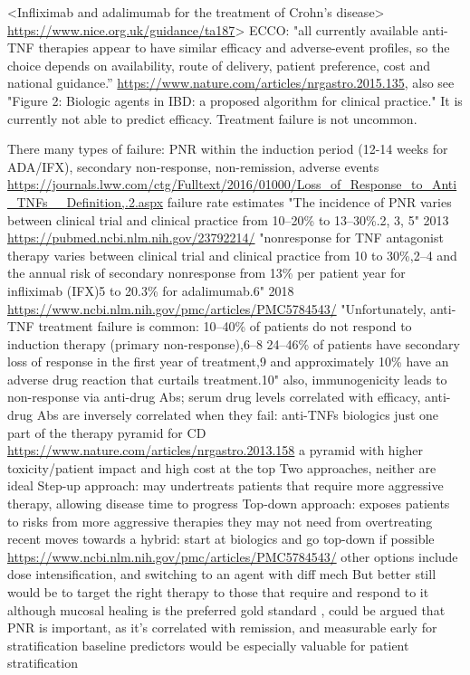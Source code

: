 \begin{outline}
        \3 <Infliximab and adalimumab for the treatment of Crohn's disease> \url{https://www.nice.org.uk/guidance/ta187}>
         ECCO: "all currently available anti-TNF therapies appear to have similar efficacy and adverse-event profiles, so the choice depends on availability, route of delivery, patient preference, cost and national guidance.” \url{https://www.nature.com/articles/nrgastro.2015.135}, also see "Figure 2: Biologic agents in IBD: a proposed algorithm for clinical practice."
    \2 It is currently not able to predict efficacy. Treatment failure is not uncommon.

\1 There many types of failure: \gls{PNR} within the induction period (12-14 weeks for ADA/IFX), secondary non-response, non-remission, adverse events \url{https://journals.lww.com/ctg/Fulltext/2016/01000/Loss_of_Response_to_Anti_TNFs__Definition,.2.aspx}
    \2 failure rate estimates 
        \3 "The incidence of PNR varies between clinical trial and clinical practice from 10–20\% to 13–30\%.2, 3, 5" 2013 \url{https://pubmed.ncbi.nlm.nih.gov/23792214/}
        \3 "nonresponse for TNF antagonist therapy varies between clinical trial and clinical practice from 10 to 30\%,2–4 and the annual risk of secondary nonresponse from 13\% per patient year for infliximab (IFX)5 to 20.3\% for adalimumab.6" 2018 \url{https://www.ncbi.nlm.nih.gov/pmc/articles/PMC5784543/}
        \3 "Unfortunately, anti-TNF treatment failure is common: 10–40\% of patients do not respond to induction therapy (primary non-response),6–8 24–46\% of patients have secondary loss of response in the first year of treatment,9 and approximately 10\% have an adverse drug reaction that curtails treatment.10" \autocite{kennedy2019PredictorsAntiTNFTreatment}
    \2 also, immunogenicity leads to non-response via anti-drug Abs; serum drug levels correlated with efficacy, anti-drug Abs are inversely correlated \autocite{lichtenstein2013ComprehensiveReviewAntitumor}
    \2 when they fail: anti-TNFs biologics just one part of the therapy pyramid for CD \url{https://www.nature.com/articles/nrgastro.2013.158}
    \2 a pyramid with higher toxicity/patient impact and high cost at the top
    \2 Two approaches, neither are ideal
        \3 Step-up approach: may undertreats patients that require more aggressive therapy, allowing disease time to progress
        \3 Top-down approach: exposes patients to risks from more aggressive therapies they may not need from overtreating
        \3 recent moves towards a hybrid: start at biologics and go top-down if possible \url{https://www.ncbi.nlm.nih.gov/pmc/articles/PMC5784543/}
    \2 other options include dose intensification, and switching to an agent with diff mech \autocite{lichtenstein2013ComprehensiveReviewAntitumor}
    \2 But better still would be to target the right therapy to those that require and respond to it
        \3 although mucosal healing is the preferred gold standard \autocite{roda2020CrohnDisease}, could be argued that PNR is important, as it's correlated with remission, and measurable early for stratification
        \3 baseline predictors would be especially valuable for patient stratification


\end{outline}
